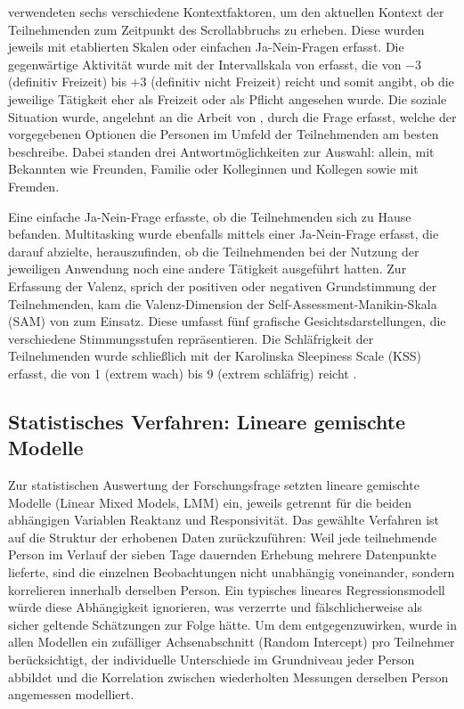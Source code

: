 \documentclass[11pt,a4paper]{article}
\begin{document}
\citet{meinhardt2025scrolling} verwendeten sechs verschiedene Kontextfaktoren, um den
aktuellen Kontext der Teilnehmenden zum Zeitpunkt des Scrollabbruchs zu erheben. Diese wurden
jeweils mit etablierten Skalen oder einfachen Ja-Nein-Fragen erfasst. Die gegenwärtige
Aktivität wurde mit der Intervallskala von \citet{samdahl1991leisure} erfasst, die von $-3$ (\glqq definitiv
Freizeit\grqq{}) bis $+3$ (\glqq definitiv nicht Freizeit\grqq{}) reicht und somit angibt, ob
die jeweilige Tätigkeit eher als Freizeit oder als Pflicht angesehen wurde. Die soziale
Situation wurde, angelehnt an die Arbeit von \citet{akpinar2023context}, durch die Frage erfasst, welche
der vorgegebenen Optionen die Personen im Umfeld der Teilnehmenden am besten beschreibe.
Dabei standen drei Antwortmöglichkeiten zur Auswahl: allein, mit Bekannten wie Freunden, Familie oder Kolleginnen und Kollegen sowie mit Fremden.

Eine einfache Ja-Nein-Frage erfasste, ob die Teilnehmenden sich zu Hause befanden.
Multitasking wurde ebenfalls mittels einer Ja-Nein-Frage erfasst, die darauf abzielte,
herauszufinden, ob die Teilnehmenden bei der Nutzung der jeweiligen Anwendung noch eine
andere Tätigkeit ausgeführt hatten. Zur Erfassung der Valenz, sprich der positiven oder
negativen Grundstimmung der Teilnehmenden, kam die Valenz-Dimension der
Self-Assessment-Manikin-Skala (SAM) von \citet{bradley1994sam} zum Einsatz. Diese umfasst fünf
grafische Gesichtsdarstellungen, die verschiedene Stimmungsstufen repräsentieren. Die
Schläfrigkeit der Teilnehmenden wurde schließlich mit der Karolinska Sleepiness Scale (KSS)
erfasst, die von 1 (\glqq extrem wach\grqq{}) bis 9 (\glqq extrem schläfrig\grqq{}) reicht
\citep{meinhardt2025scrolling}.

\subsection{Statistisches Verfahren: Lineare gemischte Modelle}

Zur statistischen Auswertung der Forschungsfrage setzten \citet{meinhardt2025scrolling}
lineare gemischte Modelle (Linear Mixed Models, LMM) ein, jeweils getrennt für die beiden
abhängigen Variablen Reaktanz und Responsivität. Das gewählte Verfahren ist auf die Struktur
der erhobenen Daten zurückzuführen: Weil jede teilnehmende Person im Verlauf der sieben Tage
dauernden Erhebung mehrere Datenpunkte lieferte, sind die einzelnen Beobachtungen nicht
unabhängig voneinander, sondern korrelieren innerhalb derselben Person. Ein typisches
lineares Regressionsmodell würde diese Abhängigkeit ignorieren, was verzerrte und
fälschlicherweise als sicher geltende Schätzungen zur Folge hätte. Um dem entgegenzuwirken,
wurde in allen Modellen ein zufälliger Achsenabschnitt (Random Intercept) pro Teilnehmer
berücksichtigt, der individuelle Unterschiede im Grundniveau jeder Person abbildet und die
Korrelation zwischen wiederholten Messungen derselben Person angemessen modelliert.
\end{document}
